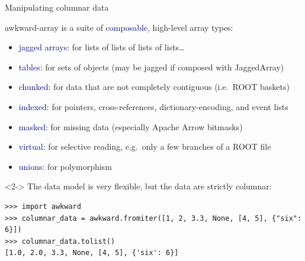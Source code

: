 \documentclass[aspectratio=169]{beamer}
\begin{document}
\begin{frame}[fragile]{Manipulating columnar data}
\vspace{0.5 cm}

awkward-array is a suite of \textcolor{darkblue}{composable}, high-level array types:
\begin{itemize}
\item \textcolor{darkblue}{jagged arrays:} for lists of lists of lists of lists\ldots
\item \textcolor{darkblue}{tables:} for sets of objects (may be jagged if composed with JaggedArray)
\item \textcolor{darkblue}{chunked:} for data that are not completely contiguous (i.e.\ ROOT baskets)
\item \textcolor{darkblue}{indexed:} for pointers, cross-references, dictionary-encoding, and event lists
\item \textcolor{darkblue}{masked:} for missing data (especially Apache Arrow bitmasks)
\item \textcolor{darkblue}{virtual:} for selective reading, e.g.\ only a few branches of a ROOT file
\item \textcolor{darkblue}{unions:} for polymorphism
\end{itemize}

\vspace{0.5 cm}
\begin{uncoverenv}<2->
The data model is very flexible, but the data are strictly columnar:

\scriptsize
\begin{verbatim}
>>> import awkward
>>> columnar_data = awkward.fromiter([1, 2, 3.3, None, [4, 5], {"six": 6}])
>>> columnar_data.tolist()
[1.0, 2.0, 3.3, None, [4, 5], {'six': 6}]
\end{verbatim}
\end{uncoverenv}
\end{frame}
\end{document}
